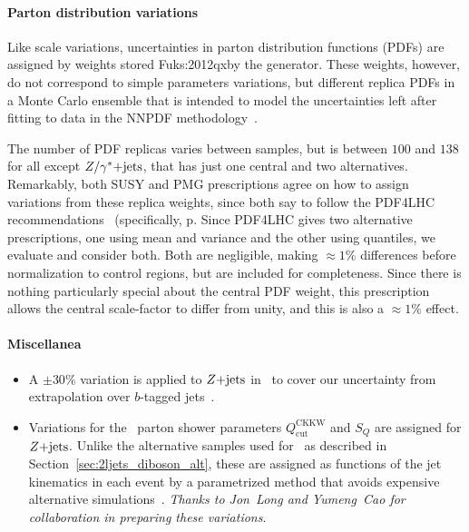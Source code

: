 \paragraph{Parton distribution variations}
Like scale variations, uncertainties in parton distribution functions (PDFs)
are assigned by weights stored Fuks:2012qxby the generator.
These weights, however, do not correspond to simple parameters variations,
but different replica PDFs in a Monte Carlo ensemble
that is intended to model the uncertainties left after fitting to data
in the NNPDF methodology~\cite{NNPDF:2017mvq,BALL2011112,BALL2012608}.

The number of PDF replicas varies between samples, but is between
$100$ and $138$ for all except $Z/\gamma^*\mathrm{+jets}$, that has just one central and two
alternatives.
Remarkably, both SUSY and PMG prescriptions agree on how to assign variations
from these replica weights, since both say to follow the PDF4LHC
recommendations~\cite{PDF4LHC_Butterworth_2016} (specifically, p.
Since PDF4LHC gives two alternative prescriptions, one using mean and variance
and the other using quantiles, we evaluate and consider both.
Both are negligible, making $\approx 1\%$ differences before normalization
to control regions, but are included for completeness.
Since there is nothing particularly special about the central PDF weight,
this prescription allows the central scale-factor to differ from unity,
and this is also a $\approx 1\%$ effect.

\paragraph{Miscellanea}
\begin{itemize}
\item A $\pm30\%$ variation is applied to $Z\mathrm{+jets}$ in \crtt\ to cover our
uncertainty from extrapolation over $b$-tagged
jets~\cite{atlas_twiki_susytheoretical}.
\item Variations for the \sherpa\ parton shower parameters
$Q_\textrm{cut}^\textrm{CKKW}$ and
$S_Q$ are assigned for $Z\mathrm{+jets}$.
Unlike the alternative samples used for \diboson\ as described in
Section~\ref{sec:2ljets_diboson_alt}, these are assigned as functions of the
jet kinematics in each event by a parametrized method that avoids expensive
alternative simulations~\cite{Anders:2125718, atlas_twiki_susytheoretical}.
\emph{Thanks to Jon~Long and Yumeng~Cao for collaboration in preparing these
variations}.
\end{itemize}

